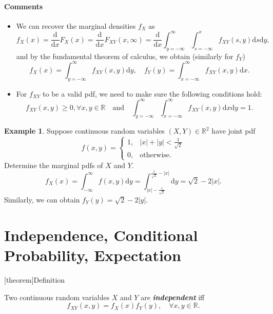 \documentclass[12pt]{report}
\theoremstyle{definition}
\begin{document}
\paragraph{Comments}
\begin{itemize}
    \item We can recover the marginal densities $f_X$ as
        \[
            f_X(x)=\frac{\mathrm{d}}{\mathrm{d}x}F_X(x)
            =\frac{\mathrm{d}}{\mathrm{d}x}F_{XY}(x,\infty)
            =\frac{\mathrm{d}}{\mathrm{d}x}\int_{y=-\infty}^{\infty} 
            \int_{s=-\infty}^{x} f_{XY}(s,y)\mathrm{d}s\mathrm{d}y,
        \]
        and by the fundamental theorem of calculus, we obtain
        (similarly for $f_Y$)
        \[
            f_X(x)=\int_{y=-\infty}^{\infty} f_{XY}(x,y)\mathrm{d}y,\quad
            f_Y(y)=\int_{x=-\infty}^{\infty} f_{XY}(x,y)\mathrm{d}x.
        \]
    \item For $f_{XY}$ to be a valid pdf, we need to make sure the following
        conditions hold:
        \[
            f_{XY}(x,y)\ge 0,\forall x,y\in\mathbb{R}
            \quad\text{and}\quad
            \int_{y=-\infty}^{\infty} \int_{x=-\infty}^{\infty}
            f_{XY}(x,y)\mathrm{d}x\mathrm{d}y=1.
        \]
\end{itemize} 

\newtheorem{marginal pdf determination eg}[theorem]{Example}
\begin{marginal pdf determination eg}
    Suppose continuous random variables $(X,Y)\in\mathbb{R}^{2}$ have joint pdf
    \[
        f(x,y)=
        \begin{cases}
            1, & |x|+|y|<\frac{1}{\sqrt{2}} \\
            0, & \text{otherwise}.
        \end{cases} 
    \]
    Determine the marginal pdfs of $X$ and $Y$.
    \[
        f_X(x)=\int_{-\infty}^{\infty} f(x,y)\mathrm{d}y
        =\int_{|x|-\frac{1}{\sqrt{2}}}^{\frac{1}{\sqrt{2}}-|x|} \mathrm{d}y
        =\sqrt{2}-2|x|.
    \]
    Similarly, we can obtain $f_Y(y)=\sqrt{2}-2|y|$.
\end{marginal pdf determination eg}


\section{Independence, Conditional Probability, Expectation}

[theorem]{Definition}
\begin{independence of two continuous RV}
    Two continuous random variables $X$ and $Y$ are \textbf{\emph{independent}}
    iff
    \[
        f_{XY}(x,y)=f_X(x)f_Y(y),\quad\forall x,y\in\mathbb{R}.
    \]
\end{independence of two continuous RV}
\end{document}

